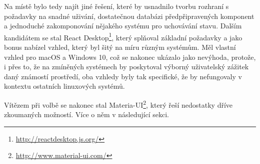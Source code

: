 Na místě bylo tedy najít jiné řešení, které by usnadnilo tvorbu rozhraní s požadavky na snadné uživání, dostatečnou databázi předpřipravených komponent a jednoduché zakomponování nějakého systému pro uchovávání stavu. Dalším kandidátem se stal React Desktop\footnote{\url{http://reactdesktop.js.org/}}, který splňoval základní požadavky a jako bonus nabízel vzhled, který byl šitý na míru různým systémům. Měl vlastní vzhled pro macOS a Windows 10, což se nakonec ukázalo jako nevýhoda, protože, i přes to, že na zmíněných systémech by poskytoval výborný uživatelský zážitek daný známostí prostředí, oba vzhledy byly tak specifické, že by nefungovaly v kontextu ostatních linuxových systémů.

Vítězem při volbě se nakonec stal Materia-UI\footnote{\url{http://www.material-ui.com/}}, který řeší nedostatky dříve zkoumaných možností. Více o něm v následující sekci.




